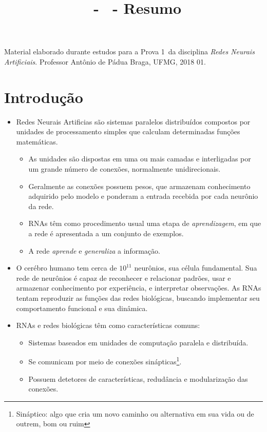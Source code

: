 \documentclass{article}
\title{\ufmgdisciplina\,  - \ufmgtema \, - Resumo}
\author{\ufmgestudante}
\date{\ufmgsemestre}
\newcommand{\ufmgdisciplina}{Redes Neurais Artificiais}
\newcommand{\ufmgtema}{Prova 1}
\newcommand{\ufmgsemestre}{2018 01}
\newcommand{\ufmgprofessor}{Antônio de Pádua Braga}
\begin{document}
\maketitle

Material elaborado durante estudos para a \ufmgtema \,  da disciplina \emph{\ufmgdisciplina}. Professor \ufmgprofessor, UFMG, \ufmgsemestre.

\section{Introdução}

\begin{itemize}

	\item Redes Neurais Artificias são sistemas paralelos distribuídos compostos por unidades de processamento simples que calculam determinadas funções matemáticas.
	
	\begin{itemize} 
		\item As unidades são dispostas em uma ou mais camadas e interligadas por um grande número de conexões, normalmente unidirecionais. 
		\item Geralmente as conexões possuem pesos, que armazenam conhecimento adquirido pelo modelo e ponderam a entrada recebida por cada neurônio da rede.
		\item RNAs têm como procedimento usual uma etapa de \emph{aprendizagem}, em que a rede é apresentada a um conjunto de exemplos.
		\item A rede \emph{aprende} e \emph{generaliza} a informação.
	\end{itemize}

	\item O cerébro humano tem cerca de $10^{11}$ neurônios, sua célula fundamental. Sua rede de neurônios é capaz de reconhecer e relacionar padrões, usar e armazenar conhecimento por experiência, e interpretar observações. As RNAs tentam reproduzir as funções das redes biológicas, buscando implementar seu comportamento funcional e sua dinâmica. 

	\item RNAs e redes biológicas têm como características comuns:

	\begin{itemize}
		\item Sistemas baseados em unidades de computação paralela e distribuída.
		\item Se comunicam por meio de conexões sinápticas\footnote{Sináptico: algo que cria um novo caminho ou alternativa em sua vida ou de outrem, bom ou ruim}.
		\item Possuem detetores de características, redudância e modularização das conexões.
	\end{itemize}


\end{itemize}
\end{document}
